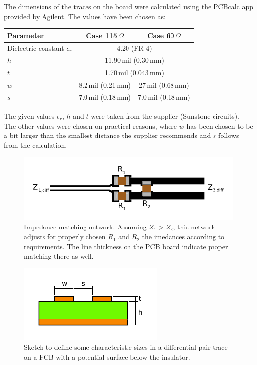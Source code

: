 The dimensions of the traces on the board were calculated using the PCBcalc app provided by Agilent. The values have been chosen as:
\begin{center}
\begin{tabular}{lcc}
    \toprule %
    Parameter & Case 115\,$\Omega$ & Case 60\,$\Omega$ \\
    \midrule %
    Dielectric constant $\epsilon_r$ & \multicolumn{2}{c}{4.20 (FR-4)} \\
    $h$ & \multicolumn{2}{c}{11.90\,mil (0.30\,mm)} \\
    $t$ & \multicolumn{2}{c}{1.70\,mil (0.043\,mm)} \\
    $w$ & 8.2\,mil (0.21\,mm) & 27\,mil (0.68\,mm) \\
    $s$ & 7.0\,mil (0.18\,mm) & 7.0\,mil (0.18\,mm) \\
    \bottomrule %
\end{tabular}
\end{center}
The given values $\epsilon_r$, $h$ and $t$ were taken from the supplier (Sunstone circuits). The other values were chosen on practical reasons, where $w$ has been chosen to be a bit larger than the smallest distance the supplier recommends and $s$ follows from the calculation.


\begin{figure}[hbtp]
	\begin{center}
	\includegraphics[width=.7\textwidth]{img/impedmatch.pdf}
	\end{center}
	\caption{Impedance matching network. Assuming $Z_1>Z_2$, this network adjusts for properly chosen $R_1$ and $R_2$ the imedances according to requirements. The line thickness on the PCB board indicate proper matching there as well.}
	\label{fig:mpedmatch}
\end{figure}

\begin{figure}[hbtp]
	\begin{center}
	\includegraphics[width=.4\textwidth]{img/diffpair.pdf}
	\end{center}
	\caption{Sketch to define some characteristic sizes in a differential pair trace on a PCB with a potential surface below the insulator.}
	\label{fig:diffpair}
\end{figure}


